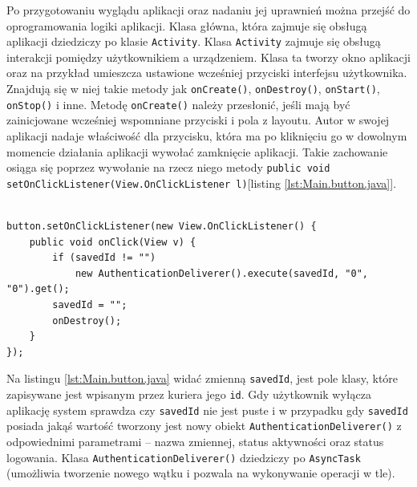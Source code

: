 \documentclass[eng,printmode,oneside]{mgr}
\begin{document}
Po przygotowaniu wyglądu aplikacji oraz nadaniu jej uprawnień można przejść
do oprogramowania logiki aplikacji. Klasa główna, która zajmuje się obsługą
aplikacji dziedziczy po klasie \texttt{Activity}. Klasa \texttt{Activity} zajmuje
się obsługą interakcji pomiędzy użytkownikiem a urządzeniem. Klasa ta tworzy okno aplikacji
oraz na przykład umieszcza ustawione wcześniej przyciski interfejsu użytkownika.
Znajdują się w niej takie metody jak \texttt{onCreate()}, \texttt{onDestroy()},
\texttt{onStart()}, \texttt{onStop()} i inne. Metodę \texttt{onCreate()} należy
przesłonić, jeśli mają być zainicjowane wcześniej wspomniane przyciski i pola z layoutu. Autor w swojej aplikacji nadaje
właściwość dla przycisku, która ma po kliknięciu go w dowolnym momencie
działania aplikacji wywołać zamknięcie aplikacji. Takie zachowanie osiąga się
poprzez wywołanie na rzecz niego metody \texttt{public void
setOnClickListener(View.OnClickListener l)}[listing \ref{lst:Main.button.java}].

\begin{lstlisting}[caption=Ustawienie właściwości przycisku
``Off'' w głównej klasie aplikacji mobilnej w
metodzie onCreate(),label=lst:Main.button.java] 

button.setOnClickListener(new View.OnClickListener() { 
	public void onClick(View v) { 
		if (savedId != "")
			new AuthenticationDeliverer().execute(savedId, "0", "0").get();
		savedId = "";
		onDestroy();
	}
});
\end{lstlisting}

Na listingu \ref{lst:Main.button.java} widać zmienną \texttt{savedId},
jest pole klasy, które zapisywane jest wpisanym przez kuriera jego \texttt{id}. Gdy użytkownik wyłącza
aplikację system sprawdza czy \texttt{savedId} nie jest puste i w przypadku gdy
\texttt{savedId} posiada jakąś wartość tworzony jest nowy obiekt
\texttt{AuthenticationDeliverer()} z odpowiednimi parametrami -- nazwa
zmiennej, status aktywności oraz status logowania. Klasa
\texttt{AuthenticationDeliverer()} dziedziczy po \texttt{AsyncTask} (umożliwia
tworzenie nowego wątku i pozwala na wykonywanie operacji w tle). 
\end{document}
